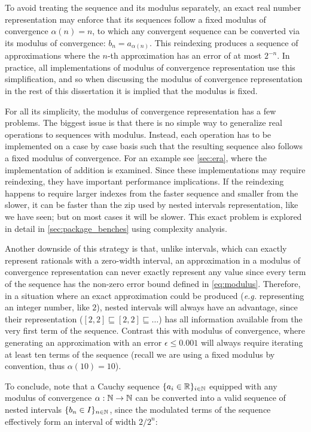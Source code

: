 To avoid treating the sequence and its modulus separately, an exact real number representation may enforce that its sequences follow a fixed modulus of convergence $\alpha(n) = n$, to which any convergent sequence can be converted via its modulus of convergence: $b_n = a_{\alpha(n)}$. This reindexing produces a sequence of approximations where the $n$-th approximation has an error of at most $2^{-n}$. In practice, all implementations of modulus of convergence representation use this simplification, and so when discussing the modulus of convergence representation in the rest of this dissertation it is implied that the modulus is fixed.

For all its simplicity, the modulus of convergence representation has a few problems. The biggest issue is that there is no simple way to generalize real operations to sequences with modulus. Instead, each operation has to be implemented on a case by case basis such that the resulting sequence also follows a fixed modulus of convergence. For an example see \cref{sec:era}, where the implementation of addition is examined. Since these implementations may require reindexing, they have important performance implications. If the reindexing happens to require larger indexes from the faster sequence and smaller from the slower, it can be faster than the zip used by nested intervals representation, like we have seen; but on most cases it will be slower. This exact problem is explored in detail in \cref{sec:package_benches} using complexity analysis.

Another downside of this strategy is that, unlike intervals, which can exactly represent rationals with a zero-width interval, an approximation in a modulus of convergence representation can never exactly represent any value since every term of the sequence has the non-zero error bound defined in \cref{eq:modulus}. Therefore, in a situation where an exact approximation could be produced (\textit{e.g.} representing an integer number, like $2$), nested intervals will always have an advantage, since their representation ($[2,2] \sqsubseteq [2,2] \sqsubseteq \dots $) has all information available from the very first term of the sequence. Contrast this with modulus of convergence, where generating an approximation with an error $\epsilon \leq 0.001$ will always require iterating at least ten terms of the sequence (recall we are using a fixed modulus by convention, thus $\alpha(10)=10$).

To conclude, note that a Cauchy sequence $\{a_i \in \mathbb{R}\}_{i \in \mathbb{N}}$ equipped with any modulus of convergence $\alpha:\mathbb{N} \rightarrow \mathbb{N}$ can be converted into a valid sequence of nested intervals $\{b_n \in I\}_{n \in \mathbb{N}}$, since the modulated terms of the sequence effectively form an interval of width $2/2^n$:

